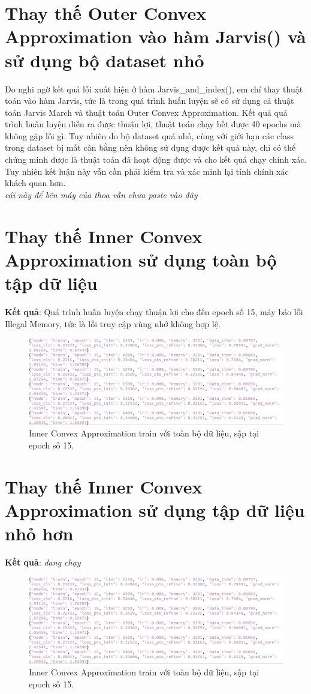 \documentclass[12pt,a4paper,openany,oneside]{report}
\begin{document}
\section{Thay thế Outer Convex Approximation vào hàm Jarvis() và sử dụng bộ dataset nhỏ}
Do nghi ngờ kết quả lỗi xuất hiện ở hàm Jarvis\_and\_index(), em chỉ thay thuật toán vào hàm Jarvis, tức là trong quá trình huấn luyện sẽ có sử dụng cả thuật toán Jarvis March và thuật toán Outer Convex Approximation. Kết quả quá trình huấn luyện diễn ra được thuận lợi, thuật toán chạy hết được 40 epochs mà không gặp lỗi gì. Tuy nhiên do bộ dataset quá nhỏ, cùng với giới hạn các class trong dataset bị mất cân bằng nên không sử dụng được kết quả này, chỉ có thể chứng minh được là thuật toán đã hoạt động được và cho kết quả chạy chính xác. Tuy nhiên kết luận này vẫn cần phải kiểm tra và xác minh lại tính chính xác khách quan hơn. \\
\textit{cái này để bên máy của thoa vẫn chưa paste vào đây}
\section{Thay thế Inner Convex Approximation sử dụng toàn bộ tập dữ liệu}
\textbf{Kết quả}: Quá trình huấn luyện chạy thuận lợi cho đến epoch số 15, máy báo lỗi Illegal Memory, tức là lỗi truy cập vùng nhớ không hợp lệ.
\begin{figure}[ht!]
	\begin{center}
		\includegraphics[width=450px]{./inner_fulldata_epoch15.JPG}
		\caption{Inner Convex Approximation train với toàn bộ dữ liệu, sập tại epoch số 15.}
		\label{inner_fulldata_epoch15}
	\end{center}
\end{figure} 
\section{Thay thế Inner Convex Approximation sử dụng tập dữ liệu nhỏ hơn}
\textbf{Kết quả}: \textit{đang chạy}
\begin{figure}[ht!]
	\begin{center}
		\includegraphics[width=450px]{./inner_fulldata_epoch15.JPG}
		\caption{Inner Convex Approximation train với toàn bộ dữ liệu, sập tại epoch số 15.}
		\label{inner_fulldata_epoch15}
	\end{center}
\end{figure} 
\end{document}
